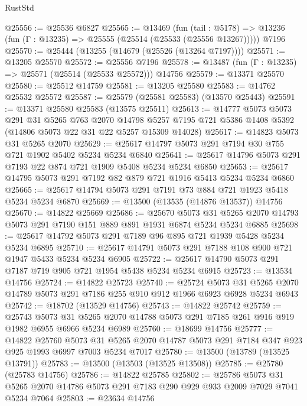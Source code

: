 \begin{lexlean}{RustStd}
\begin{coremodule}
@25556 := @25536 @6827
@25565 := @13469
    (fun (tail : @5178) => @13236 (fun (Γ : @13235) => @25555 (@25514 (@25533 (@25556 @13267)))))
    @7196
@25570 := @25444 (@13255 (@14679 (@25526 (@13264 @7197))))
@25571 := @13205 @25570
@25572 := @25556 @7196
@25578 := @13487 (fun (Γ : @13235) => @25571 (@25514 (@25533 @25572))) @14756
@25579 := @13371 @25570
@25580 := @25512 @14759
@25581 := @13205 @25580
@25583 := @14762 @25532 @25572
@25587 := @25579 (@25581 @25583) (@13570 @25443)
@25591 := @13371 @25580 @25583 (@13575 @25511)
@25613 := @14777
    @5073
    @5073
    @291
    @31
    @5265
    @763
    @2070
    @14798
    @5257
    @7195
    @721
    @5386
    @1408
    @5392
    (@14806 @5073 @22 @31 @22 @5257 @15309 @14028)
@25617 := @14823 @5073 @31 @5265 @2070
@25629 := @25617 @14797 @5073 @291 @7194 @30 @755 @721 @1902 @5402 @5234 @5234 @6840
@25641 := @25617 @14796 @5073 @291 @7193 @22 @874 @721 @1909 @5408 @5234 @5234 @6850
@25653 := @25617 @14795 @5073 @291 @7192 @82 @879 @721 @1916 @5413 @5234 @5234 @6860
@25665 := @25617 @14794 @5073 @291 @7191 @73 @884 @721 @1923 @5418 @5234 @5234 @6870
@25669 := @13500 (@13535 (@14876 @13537)) @14756
@25670 := @14822 @25669
@25686 := @25670
    @5073
    @31
    @5265
    @2070
    @14793
    @5073
    @291
    @7190
    @151
    @889
    @891
    @1931
    @6874
    @5234
    @5234
    @6885
@25698 := @25617 @14792 @5073 @291 @7189 @96 @895 @721 @1939 @5428 @5234 @5234 @6895
@25710 := @25617 @14791 @5073 @291 @7188 @108 @900 @721 @1947 @5433 @5234 @5234 @6905
@25722 := @25617 @14790 @5073 @291 @7187 @719 @905 @721 @1954 @5438 @5234 @5234 @6915
@25723 := @13534 @14756
@25724 := @14822 @25723
@25740 := @25724
    @5073
    @31
    @5265
    @2070
    @14789
    @5073
    @291
    @7186
    @255
    @910
    @912
    @1966
    @6923
    @6928
    @5234
    @6943
@25742 := @18702 (@13529 @14756)
@25743 := @14822 @25742
@25759 := @25743
    @5073
    @31
    @5265
    @2070
    @14788
    @5073
    @291
    @7185
    @261
    @916
    @919
    @1982
    @6955
    @6966
    @5234
    @6989
@25760 := @18699 @14756
@25777 := @14822
    @25760
    @5073
    @31
    @5265
    @2070
    @14787
    @5073
    @291
    @7184
    @347
    @923
    @925
    @1993
    @6997
    @7003
    @5234
    @7017
@25780 := @13500 (@13789 (@13525 @13791))
@25783 := @13500 (@13503 (@13525 @13508))
@25785 := @25780 (@25783 @14756)
@25786 := @14822 @25785
@25802 := @25786
    @5073
    @31
    @5265
    @2070
    @14786
    @5073
    @291
    @7183
    @290
    @929
    @933
    @2009
    @7029
    @7041
    @5234
    @7064
@25803 := @23634 @14756

\end{coremodule}
\end{lexlean}
